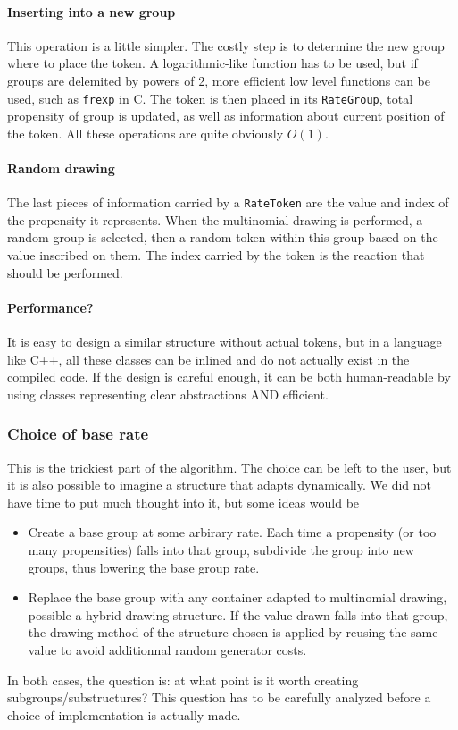\paragraph{Inserting into a new group} This operation is a little simpler. The costly step is to determine the new group where to place the token. A logarithmic-like function has to be used, but if groups are delemited by powers of 2, more efficient low level functions can be used, such as \texttt{frexp} in C. The token is then placed in its \texttt{RateGroup}, total propensity of group is updated, as well as information about current position of the token. All these operations are quite obviously $O(1)$.

\paragraph{Random drawing} The last pieces of information carried by a \texttt{RateToken} are the value and index of the propensity it represents. When the multinomial drawing is performed, a random group is selected, then a random token within this group based on the value inscribed on them. The index carried by the token is the reaction that should be performed.

\paragraph{Performance?} It is easy to design a similar structure without actual tokens, but in a language like C++, all these classes can be inlined and do not actually exist in the compiled code. If the design is careful enough, it can be both human-readable by using classes representing clear abstractions AND efficient.

\subsubsection{Choice of base rate}

This is the trickiest part of the algorithm. The choice can be left to the user, but it is also possible to imagine a structure that adapts dynamically. We did not have time to put much thought into it, but some ideas would be
\begin{itemize}
  \item Create a base group at some arbirary rate. Each time a propensity (or too many propensities) falls into that group, subdivide the group into new groups, thus lowering the base group rate.
  \item Replace the base group with any container adapted to multinomial drawing, possible a hybrid drawing structure. If the value drawn falls into that group, the drawing method of the structure chosen is applied by reusing the same value to avoid additionnal random generator costs.
\end{itemize}

In both cases, the question is: at what point is it worth creating subgroups/substructures? This question has to be carefully analyzed before a choice of implementation is actually made.

